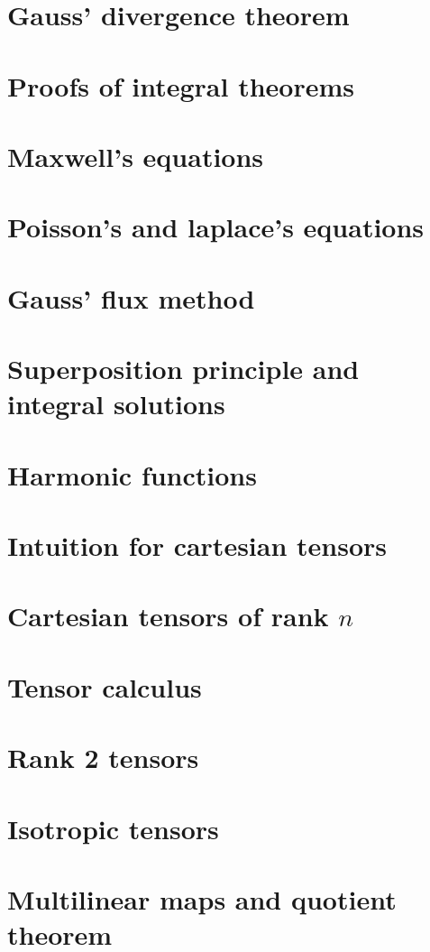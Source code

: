 \documentclass{article}
\begin{document}
\section{Gauss' divergence theorem}

\section{Proofs of integral theorems}

\section{Maxwell's equations}

\section{Poisson's and laplace's equations}

\section{Gauss' flux method}

\section{Superposition principle and integral solutions}

\section{Harmonic functions}

\section{Intuition for cartesian tensors}

\section{Cartesian tensors of rank \(n\)}

\section{Tensor calculus}

\section{Rank 2 tensors}

\section{Isotropic tensors}

\section{Multilinear maps and quotient theorem}

\end{document}

